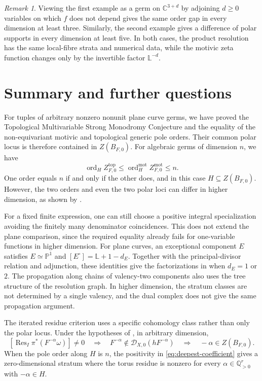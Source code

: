 \documentclass[12pt]{amsart}
\numberwithin{equation}{section}
\theoremstyle{plain}
\theoremstyle{definition}
\theoremstyle{remark}
\newtheorem{remark}[theorem]{Remark}
\theoremstyle{definition}
\DeclareMathOperator{\Res}{Res}
\DeclareMathOperator{\ord}{ord}
\newcommand{\Q}{\mathbb Q}
\newcommand{\D}{\mathscr D}
\newcommand{\Lef}{\mathbb L}
\begin{document}
\begin{remark}
Viewing the first example as a germ on $\mathbb C^{3+d}$ by adjoining $d\geq0$ variables on which $f$ does not depend gives the same order gap in every dimension at least three. Similarly, the second example gives a difference of polar supports in every dimension at least five. In both cases, the product resolution has the same local-fibre strata and numerical data, while the motivic zeta function changes only by the invertible factor $\Lef^{-d}$.
\end{remark}



\section{Summary and further questions} \label{sec:further-questions}

For tuples of arbitrary nonzero nonunit plane curve germs, we have proved the Topological Multivariable Strong Monodromy Conjecture and the equality of the non-equivariant motivic and topological generic pole orders. Their common polar locus is therefore contained in $Z(B_{F,0})$. For algebraic germs of dimension $n$, we have
\[
\ord_H Z^{\mathrm{top}}_{F,0}\leq\ord_H^{\mathrm{mot}}Z^{\mathrm{mot}}_{F,0}\leq n.
\]
One order equals $n$ if and only if the other does, and in this case $H\subseteq Z(B_{F,0})$. However, the two orders and even the two polar loci can differ in higher dimension, as shown by .

For a fixed finite expression, one can still choose a positive integral specialization avoiding the finitely many denominator coincidences. This does not extend the plane comparison, since the required equality already fails for one-variable functions in higher dimension. For plane curves, an exceptional component $E$ satisfies $E\simeq\mathbb P^1$ and $[E^\circ]=\Lef+1-d_E$. Together with the principal-divisor relation and adjunction, these identities give the factorizations in  when $d_E=1$ or $2$. The propagation along chains of valency-two components also uses the tree structure of the resolution graph. In higher dimension, the stratum classes are not determined by a single valency, and the dual complex does not give the same propagation argument.

The iterated residue criterion uses a specific cohomology class rather than only the polar locus. Under the hypotheses of , in arbitrary dimension,
\[
    [\Res_I\pi^*(F^{-\alpha}\omega)] \ne0 \quad \Longrightarrow \quad F^{-\alpha}\notin\D_{X,0}(hF^{-\alpha}) \quad \Longrightarrow \quad -\alpha\in Z(B_{F,0}).
\]
When the pole order along $H$ is $n$, the positivity in \eqref{eq:deepest-coefficient} gives a zero-dimensional stratum where the torus residue is nonzero for every $\alpha\in\Q_{>0}^r$ with $-\alpha\in H$.
\end{document}
